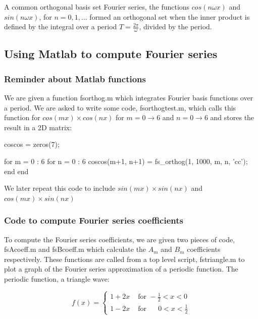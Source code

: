 \documentclass{article}
\begin{document}
A common orthogonal basis set Fourier series, the functions $cos(n \omega x)$ and $sin(n \omega x)$, for  $n = 0, 1, ... $  formed an orthogonal set when the inner product is defined by the integral over a period ${T = \frac{2\pi}{\omega}}$, divided by the period.



\subsection{Using Matlab to compute Fourier series}

\subsubsection{Reminder about Matlab functions}

We are given a function fs\textunderscore orthog.m which integrates Fourier basis functions over a period. We are asked to write some code, fs\textunderscore orthogtest.m, which calls this function for $cos(m x) \times cos(n x)$ for ${m = 0 \to 6}$ and ${n = 0 \to 6}$ and stores the result in a 2D matrix:

\begin{code}
coscos = zeros(7); %

for m = 0 : 6
    for n = 0 : 6
        coscos(m+1, n+1) = fs_orthog(1, 1000, m, n, 'cc'); 
    end
end
\end{code}


\noindent We later repeat this code to include $sin(m x) \times sin(n x)$ and $cos(m x) \times sin(n x)$


\subsubsection{Code to compute Fourier series coefficients}

To compute the Fourier series coefficients, we are given two pieces of code, fs\textunderscore Acoeff.m and fs\textunderscore Bcoeff.m which calculate the $ A_m $ and $ B_m $ coefficients respectively. These functions are called from a top level script, fs\textunderscore triangle.m to plot a graph of the Fourier series approximation of a periodic function. The periodic function, a triangle wave:



$$
	f(x)=\begin{cases}
	1+2x  &\text{ for } -\frac{1}{2}<  x< 0 \\ 
	1-2x  &\text{ for }  \:\:\:\:\:\:0<  x< \frac{1}{2}  
	\end{cases}
$$
\end{document}
